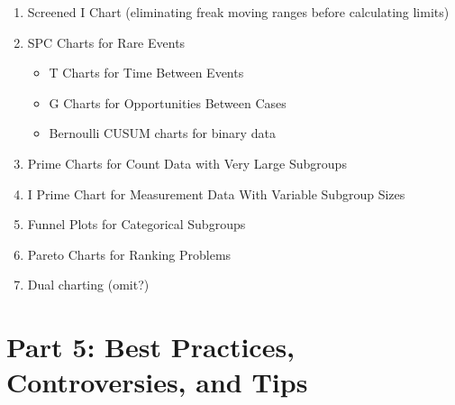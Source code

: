 \documentclass[
]{book}
\providecommand{\tightlist}{%
  \setlength{\itemsep}{0pt}\setlength{\parskip}{0pt}}
\begin{document}
\begin{enumerate}
\def\labelenumi{\arabic{enumi}.}
\tightlist
\item
  Screened I Chart (eliminating freak moving ranges before calculating limits)
\item
  SPC Charts for Rare Events

  \begin{itemize}
  \tightlist
  \item
    T Charts for Time Between Events
  \item
    G Charts for Opportunities Between Cases
  \item
    Bernoulli CUSUM charts for binary data
  \end{itemize}
\item
  Prime Charts for Count Data with Very Large Subgroups
\item
  I Prime Chart for Measurement Data With Variable Subgroup Sizes
\item
  Funnel Plots for Categorical Subgroups
\item
  Pareto Charts for Ranking Problems
\item
  Dual charting (omit?)
\end{enumerate}

\section*{Part 5: Best Practices, Controversies, and Tips}\label{part-5-best-practices-controversies-and-tips}
\end{document}
